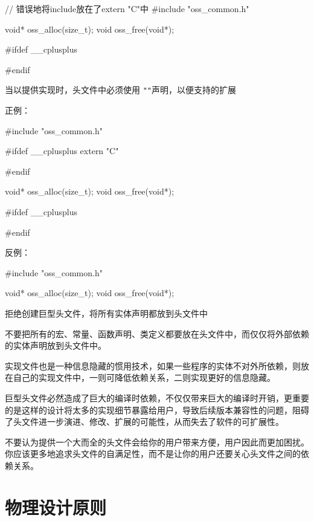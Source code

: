 \begin{content}
\begin{leftbar}
\begin{c++}
{// 错误地将include放在了extern "C"中
#include "oss_common.h"

void* oss_alloc(size_t);
void  oss_free(void*);

#ifdef  __cplusplus
}
#endif
\end{c++}
\end{leftbar}

\begin{regulation}
当以\clang{}提供实现时，头文件中必须使用
\texttt{"}\texttt{"}声明，以便支持\cpp{}的扩展
\end{regulation}

正例：
\begin{leftbar}
\begin{c++}
#include "oss_common.h"

#ifdef  __cplusplus
extern "C" {
#endif

void* oss_alloc(size_t);
void  oss_free(void*);

#ifdef  __cplusplus
}
#endif
\end{c++}
\end{leftbar}

反例：
\begin{leftbar}
\begin{c++}
#include "oss_common.h"

void* oss_alloc(size_t);
void  oss_free(void*);
\end{c++}
\end{leftbar}

\begin{advise}
拒绝创建巨型头文件，将所有实体声明都放到头文件中
\end{advise}

不要把所有的宏、常量、函数声明、类定义都要放在头文件中，而仅仅将外部依赖的实体声明放到头文件中。

实现文件也是一种信息隐藏的惯用技术，如果一些程序的实体不对外所依赖，则放在自己的实现文件中，一则可降低依赖关系，二则实现更好的信息隐藏。

巨型头文件必然造成了巨大的编译时依赖，不仅仅带来巨大的编译时开销，更重要的是这样的设计将太多的实现细节暴露给用户，导致后续版本兼容性的问题，阻碍了头文件进一步演进、修改、扩展的可能性，从而失去了软件的可扩展性。

不要认为提供一个大而全的头文件会给你的用户带来方便，用户因此而更加困扰。你应该更多地追求头文件的自满足性，而不是让你的用户还要关心头文件之间的依赖关系。

\end{content}

\section{物理设计原则}

